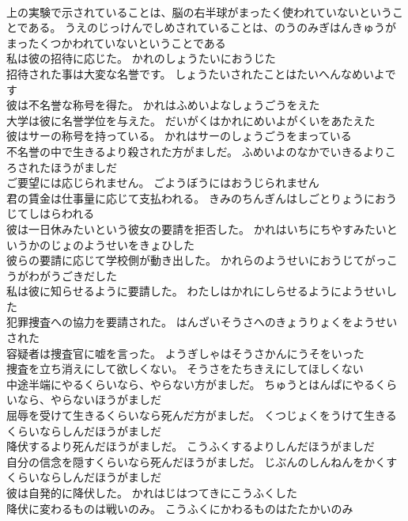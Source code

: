 \documentclass[8pt]{extreport}
\begin{document}
\begin{CJK}{UTF8}{min}
\\	上の実験で示されていることは、脳の右半球がまったく使われていないということである。	うえのじっけんでしめされていることは、のうのみぎはんきゅうがまったくつかわれていないということである 
\\	私は彼の招待に応じた。	かれのしょうたいにおうじた 
\\	招待された事は大変な名誉です。	しょうたいされたことはたいへんなめいよです 
\\	彼は不名誉な称号を得た。	かれはふめいよなしょうごうをえた 
\\	大学は彼に名誉学位を与えた。	だいがくはかれにめいよがくいをあたえた 
\\	彼はサーの称号を持っている。	かれはサーのしょうごうをまっている 
\\	不名誉の中で生きるより殺された方がましだ。	ふめいよのなかでいきるよりころされたほうがましだ 
\\	ご要望には応じられません。	ごようぼうにはおうじられません 
\\	君の賃金は仕事量に応じて支払われる。	きみのちんぎんはしごとりょうにおうじてしはらわれる 
\\	彼は一日休みたいという彼女の要請を拒否した。	かれはいちにちやすみたいというかのじょのようせいをきょひした 
\\	彼らの要請に応じて学校側が動き出した。	かれらのようせいにおうじてがっこうがわがうごきだした 
\\	私は彼に知らせるように要請した。	わたしはかれにしらせるようにようせいした 
\\	犯罪捜査への協力を要請された。	はんざいそうさへのきょうりょくをようせいされた 
\\	容疑者は捜査官に嘘を言った。	ようぎしゃはそうさかんにうそをいった 
\\	捜査を立ち消えにして欲しくない。	そうさをたちきえにしてほしくない 
\\	中途半端にやるくらいなら、やらない方がましだ。	ちゅうとはんぱにやるくらいなら、やらないほうがましだ 
\\	屈辱を受けて生きるくらいなら死んだ方がましだ。	くつじょくをうけて生きるくらいならしんだほうがましだ 
\\	降伏するより死んだほうがましだ。	こうふくするよりしんだほうがましだ 
\\	自分の信念を隠すくらいなら死んだほうがましだ。	じぶんのしんねんをかくすくらいならしんだほうがましだ 
\\	彼は自発的に降伏した。	かれはじはつてきにこうふくした 
\\	降伏に変わるものは戦いのみ。	こうふくにかわるものはたたかいのみ 

\end{CJK}
\end{document}
